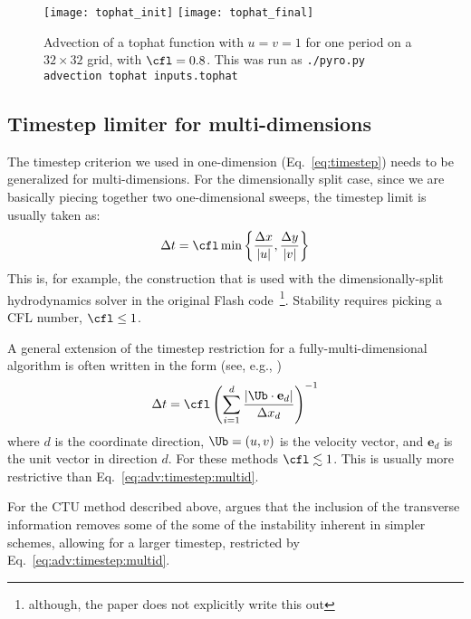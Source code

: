 \begin{figure}
\centering
\texttt{[image: tophat\_init]}\hspace{1em}
\texttt{[image: tophat\_final]}
\caption[Advection of tophat profile in 2-d]{\label{fig:adv:tophat-2d} Advection of a tophat function with
  $u = v = 1$ for one period on a $32\times 32$ grid, with $\cfl = 0.8$.
  This was run as {\tt ./pyro.py advection tophat inputs.tophat}}
\end{figure}


\subsection{Timestep limiter for multi-dimensions}
\label{sec:adv:timestep}

The timestep criterion we used in one-dimension
(Eq.~\ref{eq:timestep}) needs to be generalized for multi-dimensions.
For the dimensionally split case, since we are basically piecing
together two one-dimensional sweeps, the timestep limit is usually taken
as:
\begin{equation}
\label{eq:adv:timestep:multid}
\Delta t = \cfl \min \left \{ \frac{\Delta x}{|u|} , \frac{\Delta y}{|v|} \right \}
\end{equation}
This is, for example, the construction that is used with the
dimensionally-split hydrodynamics solver in the original Flash
code~\cite{flash}\footnote{although, the paper does not explicitly
  write this out}.  
Stability requires picking a CFL number, $\cfl \le 1$.

A general extension of the timestep restriction for a
fully-multi-dimensional algorithm is often written in the form (see,
e.g., \cite{shuosher:1989b})
\begin{equation}
\label{eq:adv:timstep:mol}
\Delta t = \cfl \left ( \sum_{i=1}^d \frac{|\Ub \cdot \mathbf{e}_d|}{\Delta x_d} \right )^{-1}
\end{equation}
where $d$ is the coordinate direction, $\Ub = (u, v)$ is the velocity
vector, and $\mathbf{e}_d$ is the unit vector in direction $d$.  For
these methods $\cfl \lesssim 1$.  This is usually more restrictive than
Eq.~\ref{eq:adv:timestep:multid}.

For the CTU method described above, \cite{colella:1990} argues that
the inclusion of the transverse information removes some of the some
of the instability inherent in simpler schemes, allowing for a larger
timestep, restricted by Eq.~\ref{eq:adv:timestep:multid}.

